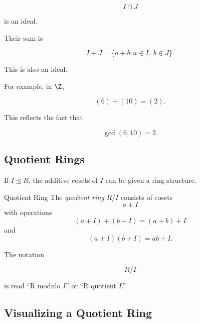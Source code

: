 \[ I\cap J \]

is an ideal.

Their sum is

\[ I+J=\{a+b:a\in I,\ b\in J\}. \]

This is also an ideal.

For example, in \(\Z\),

\[ (6)+(10)=(2). \]

This reflects the fact that

\[ \gcd(6,10)=2. \]

\subsection{Quotient Rings}
\label{subsec:quotient-rings}

If \(I\trianglelefteq R\), the additive cosets of \(I\) can be given a ring
structure.

\begin{definitionbox}{Quotient Ring}
The \emph{quotient ring} \(R/I\) consists of cosets
\[ a+I \]
with operations
\[ (a+I)+(b+I)=(a+b)+I \]
and
\[ (a+I)(b+I)=ab+I. \]
\end{definitionbox}

The notation

\[ R/I \]

is read ``R modulo \(I\)'' or ``R quotient \(I\).''

\subsection{Visualizing a Quotient Ring}
\label{subsec:visual-quotient-ring}

\begin{center}
\end{center}

